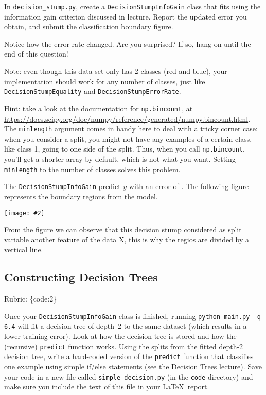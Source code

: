 \documentclass{article}
\def\rubric#1{\gre{Rubric: \{#1\}}}{}
\def\blu#1{{\color{blu}#1}}
\def\gre#1{{\color{gre}#1}}
\def\ans#1{{\color{ans}#1}}
\newcommand{\centerfig}[2]{\begin{center}\texttt{[image: \#2]}\end{center}}
\begin{document}
In \texttt{decision\string_stump.py}, \blu{create a \texttt{DecisionStumpInfoGain} class that 
fits using the information gain criterion discussed in lecture. Report the updated error you obtain, and submit the classification boundary figure.}

Notice how the error rate changed. Are you surprised? If so, hang on until the end of this question!

Note: even though this data set only has 2 classes (red and blue), your implementation should work 
for any number of classes, just like \texttt{DecisionStumpEquality} and \texttt{DecisionStumpErrorRate}.

Hint: take a look at the documentation for \texttt{np.bincount}, at \\
\url{https://docs.scipy.org/doc/numpy/reference/generated/numpy.bincount.html}. 
The \texttt{minlength} argument comes in handy here to deal with a tricky corner case:
when you consider a split, you might not have any examples of a certain class, like class 1,
going to one side of the split. Thus, when you call \texttt{np.bincount}, you'll get
a shorter array by default, which is not what you want. Setting \texttt{minlength} to the 
number of classes solves this problem.

\ans{
    The \texttt{DecisionStumpInfoGain} predict $y$ with an error of \fbox{0.355}. The following figure
    represents the boundary regions from the model.
}
\centerfig{0.7}{../figs/q6_3_decisionBoundary} 
\ans{
    From the figure we can observe that this decision stump considered as split variable another 
    feature of the data X, this is why the regios are divided by a vertical line.
}

\subsection{Constructing Decision Trees}
\rubric{code:2}

Once your \texttt{DecisionStumpInfoGain} class is finished, running \texttt{python main.py -q 6.4} will fit
a decision tree of depth~2 to the same dataset (which results in a lower training error).
Look at how the decision tree is stored and how the (recursive) \texttt{predict} function works.
\blu{Using the splits from the fitted depth-2 decision tree, write a hard-coded version of the \texttt{predict}
function that classifies one example using simple if/else statements
(see the Decision Trees lecture).} Save your code in a new file called
\texttt{simple\string_decision.py} (in the \texttt{code} directory) and make sure you include the text of this file in your \LaTeX \, report.
\end{document}
